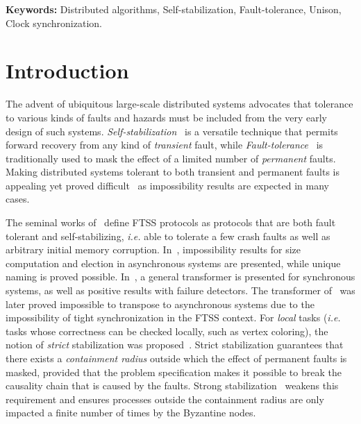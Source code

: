 \documentclass[11pt,english,letterpaper]{article}
\begin{document}
\textbf{Keywords:} Distributed algorithms, Self-stabilization, Fault-tolerance, Unison, Clock synchronization.

\section{Introduction}\label{sec:Introduction}

The advent of ubiquitous large-scale distributed systems advocates that tolerance to various kinds of faults and hazards must be included from the very early design of such systems. \emph{Self-stabilization}~\cite{D74j,D00b} is a versatile technique that permits forward recovery from any kind of \emph{transient} fault, while \emph{Fault-tolerance}~\cite{FLP85j} is traditionally used to mask the effect of a limited number of \emph{permanent} faults. Making distributed systems tolerant to both transient and permanent faults is appealing yet proved difficult~\cite{AH93c,GP93c} as impossibility results are expected in many cases.

The seminal works of~\cite{AH93c,GP93c} define FTSS protocols as protocols that are both fault tolerant and self-stabilizing, \emph{i.e.} able to tolerate a few crash faults as well as arbitrary initial memory corruption. In~\cite{AH93c}, impossibility results for size computation and election in asynchronous systems are presented, while unique naming is proved possible. In~\cite{GP93c}, a general transformer is presented for synchronous systems, as well as positive results with failure detectors. The transformer of~\cite{GP93c} was later proved impossible to transpose to asynchronous systems due to the impossibility of tight synchronization in the FTSS context. For \emph{local} tasks (\emph{i.e.} tasks whose correctness can be checked locally, such as vertex coloring), the notion of \emph{strict} stabilization was proposed~\cite{NA02c,MT07j}. Strict stabilization guarantees that there exists a \emph{containment radius} outside which the effect of permanent faults is masked, provided that the problem specification makes it possible to break the causality chain that is caused by the faults. Strong stabilization~\cite{MT06cb,DMT10ca,DMT10cd} weakens this requirement and ensures processes outside the containment radius are only impacted a finite number of times by the Byzantine nodes.
\end{document}

